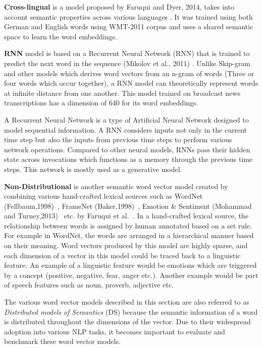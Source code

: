 \textbf{Cross-lingual} is a model proposed by Faruqui
and Dyer, 2014, takes into account semantic properties across various languages \cite{Crosslingual}. It was trained using both German and English words using WMT-2011 corpus and uses a shared semantic space to learn the word embeddings.

\textbf{RNN} model is based on a  Recurrent Neural Network (RNN) that is trained to predict the next word in the sequence (Mikolov et
al., 2011) \cite{RNN}. Unlike Skip-gram and other models which derives word vectors from an n-gram of words (Three or four words which occur together), a RNN model can theoretically
represent words at infinite distance from one another. This model trained on broadcast news transcriptions has a dimension of 640 for its word embeddings. 

A Recurrent Neural Network is a type of Artificial Neural Network designed to model  sequential information. A RNN considers inputs not only in the current time step but also the inputs from previous time steps to perform various network operations. Compared to other neural models, RNNs pass their hidden state across invocations which functions as a memory through the previous time steps. This network is mostly used as a generative model.


\textbf{Non-Distributional} is another semantic word vector model created
by combining various hand-crafted lexical sources such as
WordNet (Fellbaum,1998)~\cite{wordnet}, FrameNet (Baker,1998)~\cite{FrameNet}, Emotion \&
Sentiment (Mohammad and Turney,2013)~\cite{mohammad2013crowdsourcing} etc. by Faruqui et al.~\cite{NonDist}. In a hand-crafted lexical source, the relationship between words is assigned by human annotated based on a set rule. For example in WordNet, the words are arranged in a hierarchical manner based on their meaning. Word vectors produced by this model are highly sparse, and each dimension of a vector in this model could be traced back to a linguistic feature. An example of a linguistic feature would be emotions which are triggered by a concept (positive, negative, fear, anger etc.). Another example would be part of speech features such as noun, proverb, adjective etc.


The various word vector models described in this section are also referred to as \textit{Distributed models of Semantics} (DS) because the semantic information of a word is distributed throughout the dimensions of the vector.  Due to their widespread adoption into various NLP tasks, it becomes important to evaluate and benchmark these word vector models.


